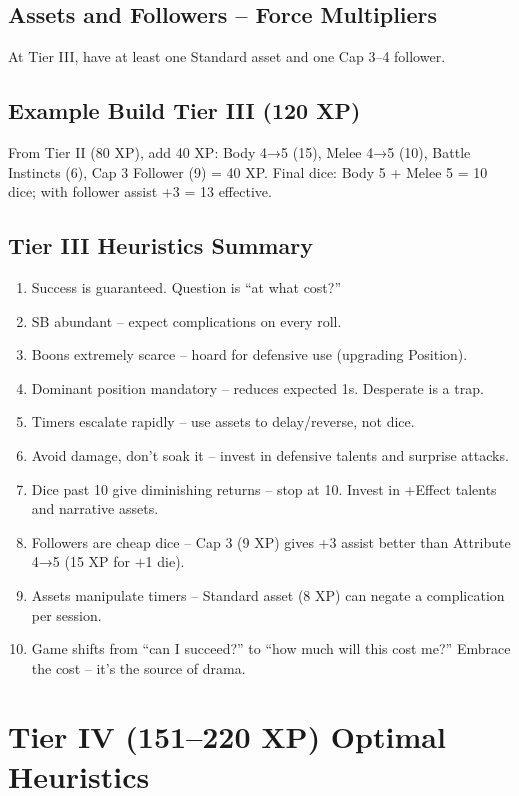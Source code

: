 \documentclass[11pt]{article}
\begin{document}
\subsection{Assets and Followers – Force Multipliers}
At Tier III, have at least one Standard asset and one Cap 3–4 follower.

\subsection{Example Build Tier III (120 XP)}
From Tier II (80 XP), add 40 XP: Body 4→5 (15), Melee 4→5 (10), Battle Instincts (6), Cap 3 Follower (9) = 40 XP. Final dice: Body 5 + Melee 5 = 10 dice; with follower assist +3 = 13 effective.

\subsection{Tier III Heuristics Summary}
\begin{enumerate}
    \item Success is guaranteed. Question is ``at what cost?''
    \item SB abundant – expect complications on every roll.
    \item Boons extremely scarce – hoard for defensive use (upgrading Position).
    \item Dominant position mandatory – reduces expected 1s. Desperate is a trap.
    \item Timers escalate rapidly – use assets to delay/reverse, not dice.
    \item Avoid damage, don't soak it – invest in defensive talents and surprise attacks.
    \item Dice past 10 give diminishing returns – stop at 10. Invest in +Effect talents and narrative assets.
    \item Followers are cheap dice – Cap 3 (9 XP) gives +3 assist better than Attribute 4→5 (15 XP for +1 die).
    \item Assets manipulate timers – Standard asset (8 XP) can negate a complication per session.
    \item Game shifts from ``can I succeed?'' to ``how much will this cost me?'' Embrace the cost – it's the source of drama.
\end{enumerate}

\section{Tier IV (151–220 XP) Optimal Heuristics}
\end{document}
